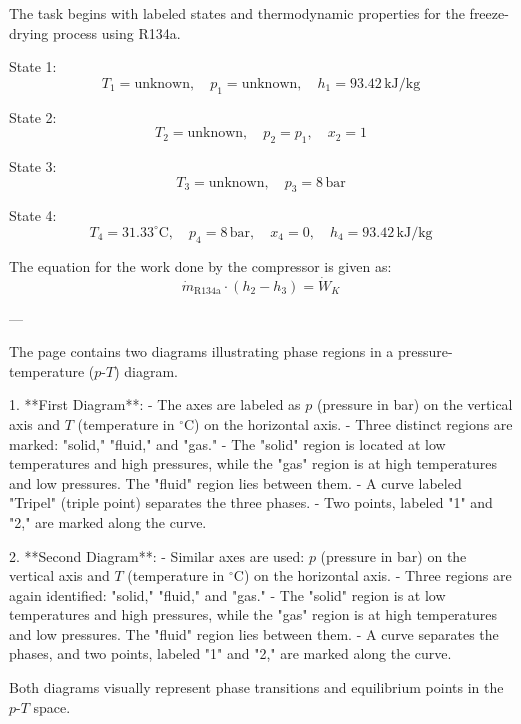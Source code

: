 The task begins with labeled states and thermodynamic properties for the freeze-drying process using R134a.  

State 1:  
\[
T_1 = \text{unknown}, \quad p_1 = \text{unknown}, \quad h_1 = 93.42 \, \text{kJ/kg}
\]  

State 2:  
\[
T_2 = \text{unknown}, \quad p_2 = p_1, \quad x_2 = 1
\]  

State 3:  
\[
T_3 = \text{unknown}, \quad p_3 = 8 \, \text{bar}
\]  

State 4:  
\[
T_4 = 31.33^\circ \text{C}, \quad p_4 = 8 \, \text{bar}, \quad x_4 = 0, \quad h_4 = 93.42 \, \text{kJ/kg}
\]  

The equation for the work done by the compressor is given as:  
\[
\dot{m}_{\text{R134a}} \cdot (h_2 - h_3) = \dot{W}_K
\]  

---

The page contains two diagrams illustrating phase regions in a pressure-temperature (\( p \)-\( T \)) diagram.  

1. **First Diagram**:  
   - The axes are labeled as \( p \) (pressure in bar) on the vertical axis and \( T \) (temperature in \( ^\circ \text{C} \)) on the horizontal axis.  
   - Three distinct regions are marked: "solid," "fluid," and "gas."  
   - The "solid" region is located at low temperatures and high pressures, while the "gas" region is at high temperatures and low pressures. The "fluid" region lies between them.  
   - A curve labeled "Tripel" (triple point) separates the three phases.  
   - Two points, labeled "1" and "2," are marked along the curve.  

2. **Second Diagram**:  
   - Similar axes are used: \( p \) (pressure in bar) on the vertical axis and \( T \) (temperature in \( ^\circ \text{C} \)) on the horizontal axis.  
   - Three regions are again identified: "solid," "fluid," and "gas."  
   - The "solid" region is at low temperatures and high pressures, while the "gas" region is at high temperatures and low pressures. The "fluid" region lies between them.  
   - A curve separates the phases, and two points, labeled "1" and "2," are marked along the curve.  

Both diagrams visually represent phase transitions and equilibrium points in the \( p \)-\( T \) space.
